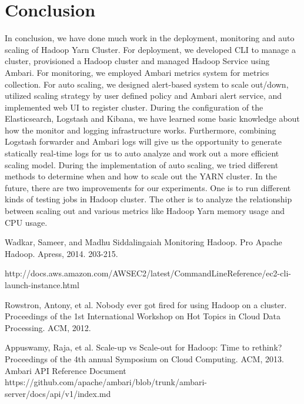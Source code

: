 \documentclass{article}
\begin{document}
\section{Conclusion}
In conclusion, we have done much work in the deployment, monitoring and auto scaling of Hadoop Yarn Cluster. For deployment, we developed CLI to manage a cluster, provisioned a Hadoop cluster and managed Hadoop Service using Ambari. For monitoring, we employed Ambari metrics system for metrics collection. For auto scaling, we designed alert-based system to scale out/down, utilized scaling strategy by user defined policy and Ambari alert service, and implemented web UI to register cluster. During the configuration of the Elasticsearch, Logstash and Kibana, we have learned some basic knowledge about how the monitor and logging infrastructure works. Furthermore,  combining Logstash forwarder and Ambari logs will give us the opportunity to generate statically real-time logs for us to auto analyze and work out a more efficient scaling model. During the implementation of auto scaling, we tried different methods to determine when and how to scale out the YARN cluster. In the future, there are two improvements for our experiments. One is to run different kinds of testing jobs in Hadoop cluster. The other is to analyze the relationship between scaling out and various metrics like Hadoop Yarn memory usage and CPU usage.


\begin{thebibliography}{4}


Wadkar, Sameer, and Madhu Siddalingaiah
\newblock Monitoring Hadoop.
\newblock  Pro Apache Hadoop. Apress, 2014. 203-215.
\label{ref:wadkar}

http://docs.aws.amazon.com/AWSEC2/latest/CommandLineReference/ec2-cli-launch-instance.html

Rowstron, Antony, et al.
\newblock Nobody ever got fired for using Hadoop on a cluster.
\newblock  Proceedings of the 1st International Workshop on Hot Topics in Cloud Data Processing. ACM, 2012.

Appuswamy, Raja, et al.
\newblock Scale-up vs Scale-out for Hadoop: Time to rethink?
\newblock Proceedings of the 4th annual Symposium on Cloud Computing. ACM, 2013.
\label{ref:ambariAPI}
Ambari API Reference Document 
\newblock https://github.com/apache/ambari/blob/trunk/ambari-server/docs/api/v1/index.md


\end{thebibliography}
\end{document}
